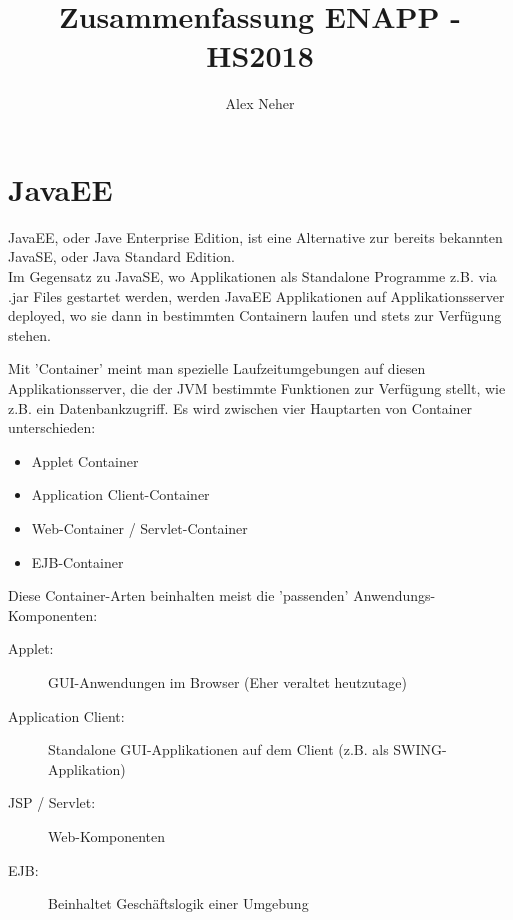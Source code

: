 \documentclass[a4paper, 11pt]{article}
\begin{document}
 
\title{Zusammenfassung ENAPP - HS2018}
\author{Alex Neher}
\maketitle

\tableofcontents
\newpage
\listoffigures
\newpage

\graphicspath{{./Pictures/}}


\section{JavaEE}
JavaEE, oder Jave Enterprise Edition, ist eine Alternative zur bereits bekannten JavaSE, oder Java Standard Edition. \\
Im Gegensatz zu JavaSE, wo Applikationen als Standalone Programme z.B. via .jar Files gestartet werden, werden JavaEE Applikationen auf Applikationsserver deployed, wo sie dann in bestimmten Containern laufen und stets zur Verfügung stehen.

\vspace{10px}

Mit 'Container' meint man spezielle Laufzeitumgebungen auf diesen Applikationsserver, die der JVM bestimmte Funktionen zur Verfügung stellt, wie z.B. ein Datenbankzugriff. Es wird zwischen vier Hauptarten von Container unterschieden:

\begin{itemize}
    \item Applet Container
    \item Application Client-Container
    \item Web-Container / Servlet-Container
    \item EJB-Container
\end{itemize}

Diese Container-Arten beinhalten meist die 'passenden' Anwendungs-Komponenten:

\begin{description}
    \item[Applet: ] GUI-Anwendungen im Browser (Eher veraltet heutzutage)
    \item[Application Client: ] Standalone GUI-Applikationen auf dem Client (z.B. als SWING-Applikation)
    \item[JSP / Servlet: ] Web-Komponenten
    \item[EJB: ] Beinhaltet Geschäftslogik einer Umgebung
\end{description}
\end{document}
